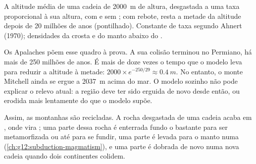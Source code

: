 \begin{omfigure}

{\small A altitude média de uma cadeia de \qty{2000}{m} de altura,
desgastada a uma taxa proporcional à sua altura, com e sem ; com rebote, resta a metade da altitude depois de 20 milhões de
anos (pontilhado). Constante de taxa segundo Ahnert (1970); densidades da
crosta e do manto abaixo do .}
\end{omfigure}

Os Apalaches põem esse quadro à prova. A sua colisão terminou no Permiano,
há mais de 250 milhões de anos. É mais de doze vezes o tempo que o modelo
leva para reduzir a altitude à metade: $2000 \times e^{-250/29} \approx
\qty{0.4}{m}$. No entanto, o monte Mitchell ainda se ergue a \qty{2037}{m}
acima do mar. O modelo sozinho não pode explicar o relevo atual: a região
deve ter sido erguida de novo desde então, ou erodida mais lentamente do
que o modelo supõe.

Assim, as montanhas são recicladas. A rocha desgastada de uma cadeia acaba
em , onde vira ; uma parte dessa rocha é
enterrada fundo o bastante para ser metamorfizada ou até para se fundir,
uma parte é levada para o manto numa 
(\cref{ch:g12:subduction-magmatism}), e uma parte é dobrada de novo numa
nova cadeia quando dois continentes colidem.

